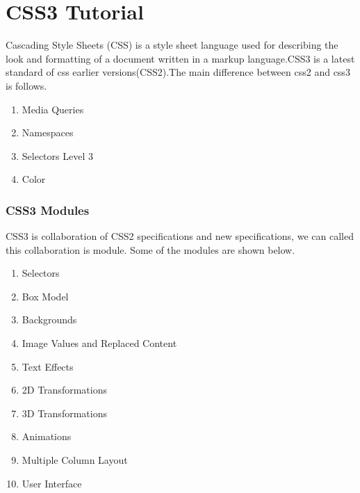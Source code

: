 \documentclass[a4paper,oneside]{book}
\numberwithin{equation}{chapter}
\begin{document}
\chapter{CSS3 Tutorial}
Cascading Style Sheets (CSS) is a style sheet language used for describing the look and formatting of a document written in a markup language.CSS3 is a latest standard of css earlier versions(CSS2).The main difference between css2 and css3 is follows.
\begin{enumerate}
\item Media Queries
\item Namespaces
\item Selectors Level 3
\item Color
\end{enumerate}
\subsection*{CSS3 Modules}
CSS3 is collaboration of CSS2 specifications and new specifications, we can called this collaboration is module. Some of the modules are shown below.
\begin{enumerate}
\item Selectors
\item Box Model
\item Backgrounds
\item Image Values and Replaced Content
\item Text Effects
\item 2D Transformations
\item 3D Transformations
\item Animations
\item Multiple Column Layout
\item User Interface
\end{enumerate}
\end{document}
